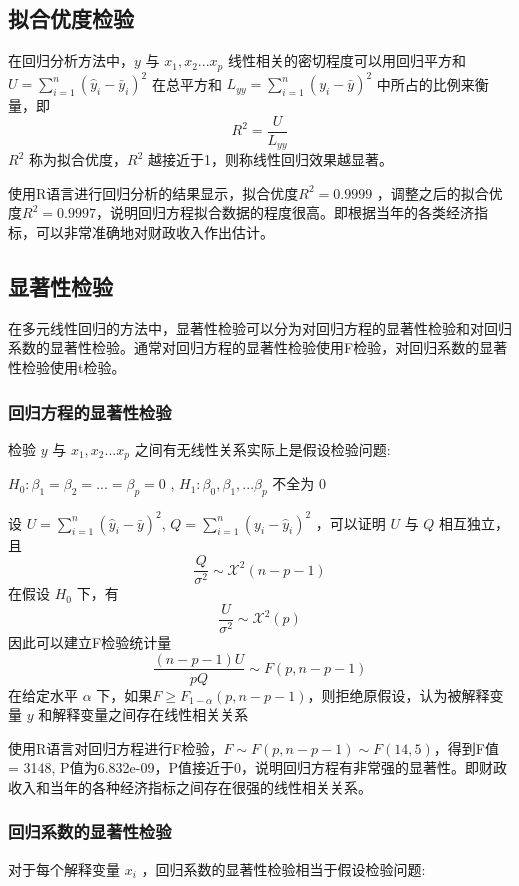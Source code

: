 \documentclass [a4paper]{article}
\begin{document}
\subsection{拟合优度检验}

在回归分析方法中，$y$ 与 $x_1,x_2...x_p$ 线性相关的密切程度可以用回归平方和 $U =\sum_{i=1}^{n}(\hat y_i -\bar y_i)^2$ 在总平方和 $L_{yy} = \sum_{i=1}^n (y_i - \bar y )^2$ 中所占的比例来衡量，即
$$
R^2= \frac{U}{L_{yy}}
$$
$R^2$ 称为拟合优度，$R^2$ 越接近于1，则称线性回归效果越显著。

使用R语言进行回归分析的结果显示，拟合优度$R^2 = 0.9999$ ，调整之后的拟合优度$R^2 = 0.9997$，说明回归方程拟合数据的程度很高。即根据当年的各类经济指标，可以非常准确地对财政收入作出估计。

\subsection{显著性检验}

在多元线性回归的方法中，显著性检验可以分为对回归方程的显著性检验和对回归系数的显著性检验。通常对回归方程的显著性检验使用F检验，对回归系数的显著性检验使用t检验。

\subsubsection{回归方程的显著性检验}

检验 $y$ 与 $x_1,x_2...x_p$ 之间有无线性关系实际上是假设检验问题:

$H_0:\beta_1= \beta_2 =...=\beta_p=0$ , $H_1:\beta_0,\beta_1,...\beta_p$ 不全为 0

设 $U = \sum_{i=1}^n(\hat y_i -\bar y)^2$, $Q=\sum_{i=1}^n(y_i-\hat y_i)^2$ ，可以证明 $U$ 与 $Q$ 相互独立，且
$$
\frac{Q}{\sigma^2} \sim \mathcal{X}^2(n-p-1)
$$
 在假设 $H_0$ 下，有
$$
\frac{U}{\sigma^2} \sim \mathcal{X}^2(p)
$$
因此可以建立F检验统计量
$$
\frac{(n-p-1)U}{pQ} \sim F(p,n-p-1)
$$
在给定水平 $\alpha$ 下，如果$F \ge F_{1-\alpha} (p,n-p-1)$，则拒绝原假设，认为被解释变量 $y$ 和解释变量之间存在线性相关关系

使用R语言对回归方程进行F检验，$F \sim F(p,n-p-1) \sim F(14,5)$，得到F值 =  3148, P值为6.832e-09，P值接近于0，说明回归方程有非常强的显著性。即财政收入和当年的各种经济指标之间存在很强的线性相关关系。
\subsubsection{回归系数的显著性检验}

对于每个解释变量 $x_i$ ，回归系数的显著性检验相当于假设检验问题:
\end{document}
